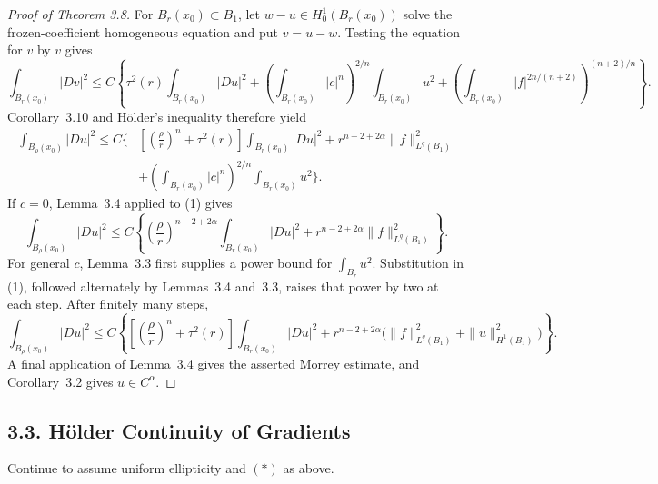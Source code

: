 \begin{proof}[Proof of Theorem 3.8]
\sketch For $B_r(x_0)\subset B_1$, let $w-u\in H^1_0(B_r(x_0))$ solve
the frozen-coefficient homogeneous equation and put $v=u-w$. Testing the
equation for $v$ by $v$ gives
\[
\int_{B_r(x_0)}|Dv|^2\leq C\left\{
\tau^2(r)\int_{B_r(x_0)}|Du|^2
+\left(\int_{B_r(x_0)}|c|^n\right)^{2/n}
\int_{B_r(x_0)}u^2
+\left(\int_{B_r(x_0)}|f|^{2n/(n+2)}\right)^{(n+2)/n}
\right\}.
\]
Corollary~3.10 and H\"older's inequality therefore yield
\[
\begin{aligned}
\int_{B_\rho(x_0)}|Du|^2\leq C\biggl\{&
\left[\left(\frac\rho r\right)^n+\tau^2(r)\right]
\int_{B_r(x_0)}|Du|^2+r^{n-2+2\alpha}\|f\|_{L^q(B_1)}^2\\
&+\left(\int_{B_r(x_0)}|c|^n\right)^{2/n}
\int_{B_r(x_0)}u^2\biggr\}.
\end{aligned}
\tag{1}
\]
If $c=0$, Lemma~3.4 applied to (1) gives
\[
\int_{B_\rho(x_0)}|Du|^2
\leq C\left\{
\left(\frac\rho r\right)^{n-2+2\alpha}
\int_{B_r(x_0)}|Du|^2
+r^{n-2+2\alpha}\|f\|_{L^q(B_1)}^2\right\}.
\]
For general $c$, Lemma~3.3 first supplies a power bound for
$\int_{B_r}u^2$. Substitution in (1), followed alternately by Lemmas~3.4
and~3.3, raises that power by two at each step. After finitely many steps,
\[
\int_{B_\rho(x_0)}|Du|^2
\leq C\left\{
\left[\left(\frac\rho r\right)^n+\tau^2(r)\right]
\int_{B_r(x_0)}|Du|^2
+r^{n-2+2\alpha}
\bigl(\|f\|_{L^q(B_1)}^2+\|u\|_{H^1(B_1)}^2\bigr)
\right\}.
\]
A final application of Lemma~3.4 gives the asserted Morrey estimate, and
Corollary~3.2 gives $u\in C^\alpha$.
\end{proof}

\subsection*{3.3. H\"older Continuity of Gradients}

Continue to assume uniform ellipticity and $(\ast)$ as above.

